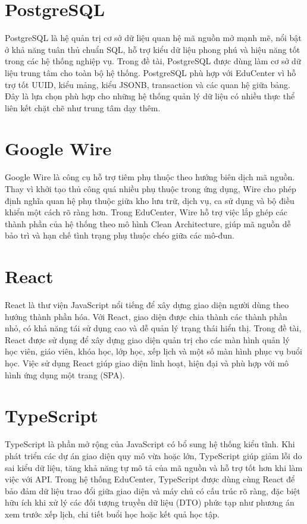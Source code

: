 \documentclass[../DoAn.tex]{subfiles}
\begin{document}
\section{PostgreSQL}
\label{section:3.5}
PostgreSQL là hệ quản trị cơ sở dữ liệu quan hệ mã nguồn mở mạnh mẽ, nổi bật ở khả năng tuân thủ chuẩn SQL, hỗ trợ kiểu dữ liệu phong phú và hiệu năng tốt trong các hệ thống nghiệp vụ. Trong đề tài, PostgreSQL được dùng làm cơ sở dữ liệu trung tâm cho toàn bộ hệ thống. PostgreSQL phù hợp với EduCenter vì hỗ trợ tốt UUID, kiểu mảng, kiểu JSONB, transaction và các quan hệ giữa bảng. Đây là lựa chọn phù hợp cho những hệ thống quản lý dữ liệu có nhiều thực thể liên kết chặt chẽ như trung tâm dạy thêm.

\section{Google Wire}
\label{section:3.6}
Google Wire là công cụ hỗ trợ tiêm phụ thuộc theo hướng biên dịch mã nguồn. Thay vì khởi tạo thủ công quá nhiều phụ thuộc trong ứng dụng, Wire cho phép định nghĩa quan hệ phụ thuộc giữa kho lưu trữ, dịch vụ, ca sử dụng và bộ điều khiển một cách rõ ràng hơn. Trong EduCenter, Wire hỗ trợ việc lắp ghép các thành phần của hệ thống theo mô hình Clean Architecture, giúp mã nguồn dễ bảo trì và hạn chế tình trạng phụ thuộc chéo giữa các mô-đun.

\section{React}
\label{section:3.7}
React là thư viện JavaScript nổi tiếng để xây dựng giao diện người dùng theo hướng thành phần hóa. Với React, giao diện được chia thành các thành phần nhỏ, có khả năng tái sử dụng cao và dễ quản lý trạng thái hiển thị. Trong đề tài, React được sử dụng để xây dựng giao diện quản trị cho các màn hình quản lý học viên, giáo viên, khóa học, lớp học, xếp lịch và một số màn hình phục vụ buổi học. Việc sử dụng React giúp giao diện linh hoạt, hiện đại và phù hợp với mô hình ứng dụng một trang (SPA).

\section{TypeScript}
\label{section:3.8}
TypeScript là phần mở rộng của JavaScript có bổ sung hệ thống kiểu tĩnh. Khi phát triển các dự án giao diện quy mô vừa hoặc lớn, TypeScript giúp giảm lỗi do sai kiểu dữ liệu, tăng khả năng tự mô tả của mã nguồn và hỗ trợ tốt hơn khi làm việc với API. Trong hệ thống EduCenter, TypeScript được dùng cùng React để bảo đảm dữ liệu trao đổi giữa giao diện và máy chủ có cấu trúc rõ ràng, đặc biệt hữu ích khi xử lý các đối tượng truyền dữ liệu (DTO) phức tạp như phương án xem trước xếp lịch, chi tiết buổi học hoặc kết quả học tập.
\end{document}
